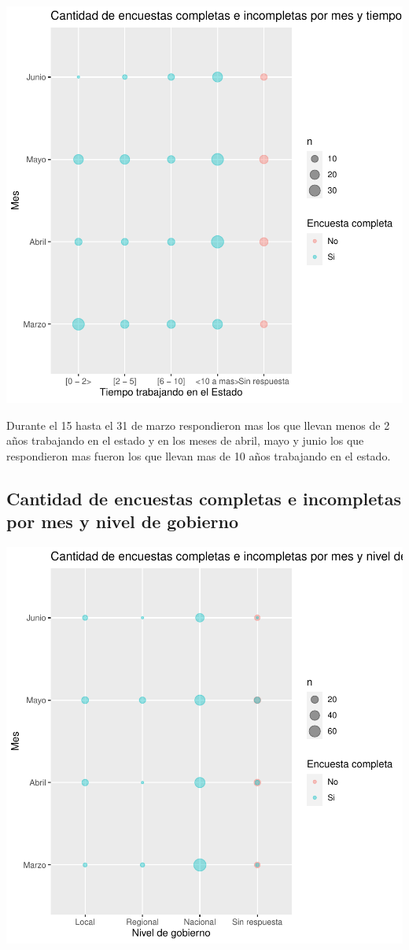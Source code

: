\documentclass{article}
\begin{document}
\includegraphics{seguimientov3-089}

Durante el 15 hasta el 31 de marzo respondieron mas los que llevan menos de 2 años trabajando en el estado y en los meses de abril, mayo y junio los que respondieron mas fueron los que llevan mas de 10 años trabajando en el estado.

\subsection{Cantidad de encuestas completas e incompletas por mes y nivel de gobierno}

\includegraphics{seguimientov3-090}
\end{document}

